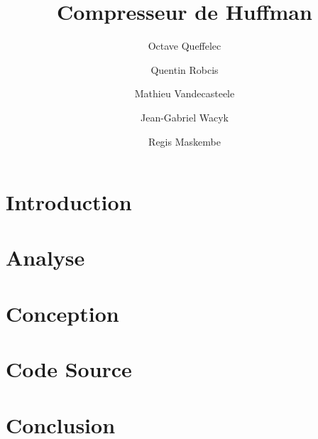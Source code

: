 \documentclass{article}
\title{Compresseur de Huffman}
\author{Octave Queffelec \and Quentin Robcis \and Mathieu Vandecasteele \and Jean-Gabriel Wacyk \and Regis Maskembe}
\begin{document}
\maketitle
\newpage


\tableofcontents
\newpage


\section{Introduction}


\newpage
\section{Analyse}


\newpage
\section{Conception}



\newpage
\section{Code Source}


\newpage
\section{Conclusion}

\end{document}
